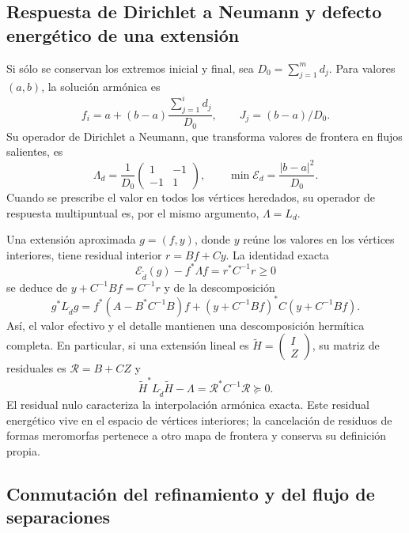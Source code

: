 \documentclass[a4paper,10pt]{article}
\theoremstyle{definition}\newtheorem{definition}[theorem]{Definición}
\theoremstyle{remark}\newtheorem{remark}[theorem]{Observación}
\numberwithin{equation}{section}
\begin{document}
\subsection{Respuesta de Dirichlet a Neumann y defecto energético de una extensión}

Si sólo se conservan los extremos inicial y final, sea
\(D_0=\sum_{j=1}^md_j\). Para valores \((a,b)\), la solución
armónica es
\[
 f_i=a+(b-a)\frac{\sum_{j=1}^id_j}{D_0},\qquad
 J_j=(b-a)/D_0.
\]
Su operador de Dirichlet a Neumann, que transforma valores de frontera en
flujos salientes, es
\begin{equation}
 \Lambda_d=\frac1{D_0}
 \begin{pmatrix}1&-1\\-1&1\end{pmatrix},\qquad
 \min\mathcal E_d=\frac{|b-a|^2}{D_0}.
 \label{eq:dtn-intervalar-k}
\end{equation}
Cuando se prescribe el valor en todos los vértices heredados, su operador
de respuesta multipuntual es, por el mismo argumento, \(\Lambda=L_d\).

Una extensión aproximada \(g=(f,y)\), donde \(y\) reúne los valores
en los vértices interiores, tiene residual interior
\(r=Bf+Cy\). La identidad exacta
\begin{equation}
 \mathcal E_{\widetilde d}(g)-f^*\Lambda f
 =r^*C^{-1}r\ge0
 \label{eq:residual-dtn-k}
\end{equation}
se deduce de \(y+C^{-1}Bf=C^{-1}r\) y de la descomposición
\[
 g^*L_{\widetilde d}g
 =f^*(A-B^*C^{-1}B)f
 +(y+C^{-1}Bf)^*C(y+C^{-1}Bf).
\]
Así, el valor efectivo y el detalle mantienen una descomposición
hermítica completa. En particular, si una
extensión lineal es \(\widetilde H=\begin{pmatrix}I\\Z\end{pmatrix}\), su matriz de
residuales es \(\mathscr R=B+CZ\) y
\[
 \widetilde H^*L_{\widetilde d}\widetilde H-\Lambda
 =\mathscr R^*C^{-1}\mathscr R\succeq0.
\]
El residual nulo caracteriza la interpolación armónica exacta. Este
residual energético vive en el espacio de vértices interiores; la
cancelación de residuos de formas meromorfas pertenece a otro mapa de
frontera y conserva su definición propia.

\subsection{Conmutación del refinamiento y del flujo de separaciones}
\end{document}
